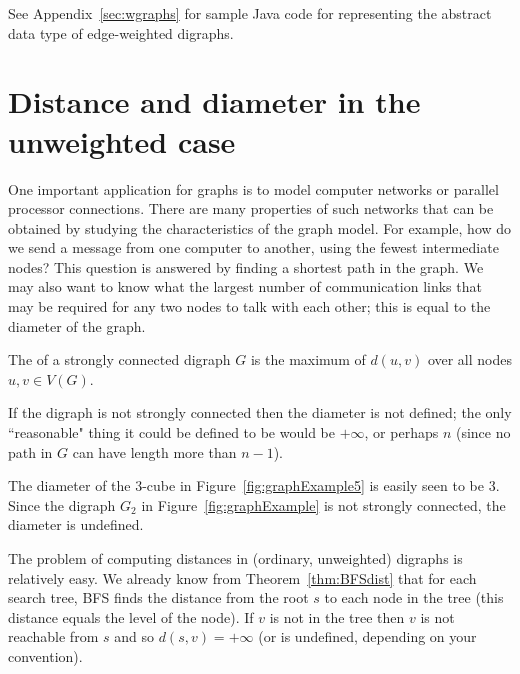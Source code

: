 See Appendix~\ref{sec:wgraphs} for sample Java code for representing
the abstract data type of edge-weighted digraphs.


\section{Distance and diameter in the unweighted
case}\label{sec:unweighted}

One important application for graphs is to model computer networks or
parallel processor connections.  There are many properties of such
networks that can be obtained by studying the characteristics of the
graph model. For example, how do we send a message from one computer to
another, using the fewest intermediate nodes? This question is answered
by finding a shortest path in the graph.  We may also want to know what
the largest number of communication links that may be required for any
two nodes to talk with each other; this is equal to the diameter of
the graph.

\begin{Definition}\label{def:diameter}
The  of a strongly connected digraph $G$ is the
maximum of $d(u,v)$ over all nodes $u, v\in V(G)$.
\end{Definition}

\begin{note} If the digraph is not strongly connected then the
diameter is not defined; the only ``reasonable" thing it could be
defined to be would be $+\infty$, or perhaps $n$ (since 
no path in $G$ can have length more than $n-1$).
\end{note}

\begin{Example}
The diameter of the $3$-cube in Figure~\ref{fig:graphExample5} is easily
seen to be $3$. Since the digraph $G_2$ in Figure~\ref{fig:graphExample}
is not strongly connected, the diameter is undefined.  
\end{Example}

The problem of computing distances in (ordinary, unweighted) digraphs is
relatively easy. We already know from Theorem~\ref{thm:BFSdist} that
for each search tree, BFS finds the distance from the root $s$ to each
node in the tree (this distance equals the level of the node). If $v$
is not in the tree then $v$ is not reachable from $s$ and so $d(s,v) =
+\infty$ (or is undefined,  depending on your convention). 

